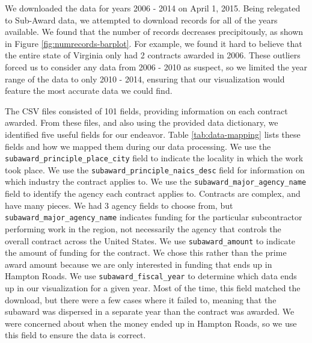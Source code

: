 \documentclass[10pt,journal,compsoc]{IEEEtran}
\begin{document}
We downloaded the data for years 2006 - 2014 on April 1, 2015.  Being relegated to Sub-Award data, we attempted to download records for all of the years available.  We found that the number of records decreases precipitously, as shown in Figure \ref{fig:numrecords-barplot}.  For example, we found it hard to believe that the entire state of Virginia only had 2 contracts awarded in 2006.  These outliers forced us to consider any data from 2006 - 2010 as suspect, so we limited the year range of the data to only 2010 - 2014, ensuring that our visualization would feature the most accurate data we could find.

The CSV files consisted of 101 fields, providing information on each contract awarded.  From these files, and also using the provided data dictionary, we identified five useful fields for our endeavor.  Table \ref{tab:data-mapping} lists these fields and how we mapped them during our data processing.  We use the {\tt subaward\_principle\_place\_city} field to indicate the locality in which the work took place.  We use the {\tt subaward\_principle\_naics\_desc} field for information on which industry the contract applies to.  We use the {\tt subaward\_major\_agency\_name} field to identify the agency each contract applies to.  Contracts are complex, and have many pieces.  We had 3 agency fields to choose from, but {\tt subaward\_major\_agency\_name} indicates funding for the particular subcontractor performing work in the region, not necessarily the agency that controls the overall contract across the United States.  We use {\tt subaward\_amount} to indicate the amount of funding for the contract.  We chose this rather than the prime award amount because we are only interested in funding that ends up in Hampton Roads.  We use {\tt subaward\_fiscal\_year} to determine which data ends up in our visualization for a given year.  Most of the time, this field matched the download, but there were a few cases where it failed to, meaning that the subaward was dispersed in a separate year than the contract was awarded.  We were concerned about when the money ended up in Hampton Roads, so we use this field to ensure the data is correct.
\end{document}
